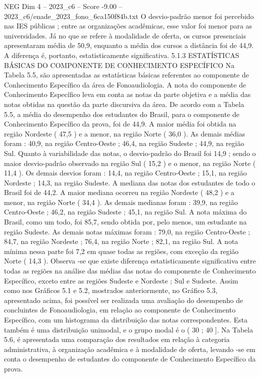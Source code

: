 \begin{textsample}{NEG Dim 4 – 2023\_c6 – Score -9.00 – 2023\_c6/enade\_2023\_fono\_6ca150f84b.txt}
O desvio-padrão menor foi percebido nas IES públicas ; entre as organizações acadêmicas, esse valor foi menor para as universidades.
Já no que se refere à modalidade de oferta, os cursos presenciais apresentaram média de 50,9, enquanto a média dos cursos a distância foi de 44,9.
A diferença é, portanto, estatisticamente significativa. 5.1.3 ESTATÍSTICAS BÁSICAS DO COMPONENTE DE CONHECIMENTO ESPECÍFICO Na Tabela 5.5, são apresentadas as estatísticas básicas referentes ao componente de Conhecimento Específico da área de Fonoaudiologia.
A nota do componente de Conhecimento Específico leva em conta as notas da parte objetiva e a média das notas obtidas na questão da parte discursiva da área.
De acordo com a Tabela 5.5, a média do desempenho dos estudantes do Brasil, para o componente de Conhecimento Específico da prova, foi de 44,9.
A maior média foi obtida na região Nordeste ( 47,5 ) e a menor, na região Norte ( 36,0 ).
As demais médias foram : 40,9, na região Centro-Oeste ; 46,4, na região Sudeste ; 44,9, na região Sul.
Quanto à variabilidade das notas, o desvio-padrão do Brasil foi 14,9 ; sendo o maior desvio-padrão observado na região Sul ( 15,2 ) e o menor, na região Norte ( 11,4 ).
Os demais desvios foram : 14,4, na região Centro-Oeste ; 15,1, na região Nordeste ; 14,3, na região Sudeste.
A mediana das notas dos estudantes de todo o Brasil foi de 44,2.
A maior mediana ocorreu na região Nordeste ( 48,2 ) e a menor, na região Norte ( 34,4 ).
As demais medianas foram : 39,9, na região Centro-Oeste ; 46,2, na região Sudeste ; 45,1, na região Sul.
A nota máxima do Brasil, como um todo, foi 85,7, sendo obtida por, pelo menos, um estudante na região Sudeste.
As demais notas máximas foram : 79,0, na região Centro-Oeste ; 84,7, na região Nordeste ; 76,4, na região Norte ; 82,1, na região Sul.
A nota mínima nessa parte foi 7,2 em quase todas as regiões, com exceção da região Norte ( 14,3 ).
Observa -se que existe diferença estatisticamente significativa entre todas as regiões na análise das médias das notas do componente de Conhecimento Específico, exceto entre as regiões Sudeste e Nordeste ; Sul e Sudeste.
Assim como nos Gráficos 5.1 e 5.2, mostrados anteriormente, no Gráfico 5.3, apresentado acima, foi possível ser realizada uma avaliação do desempenho de concluintes de Fonoaudiologia, em relação ao componente de Conhecimento Específico, com um histograma da distribuição das notas correspondentes.
Esta também é uma distribuição unimodal, e o grupo modal é o ( 30 ; 40 ].
Na Tabela 5.6, é apresentada uma comparação dos resultados em relação à categoria administrativa, à organização acadêmica e à modalidade de oferta, levando -se em conta o desempenho de estudantes do componente de Conhecimento Específico da prova.

\end{textsample}
